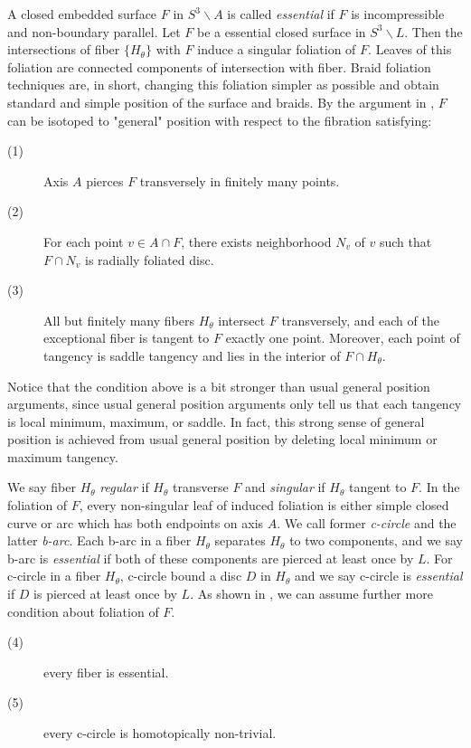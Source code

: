 \documentclass[12pt]{amsart}
\begin{document}
   A closed embedded surface $F$ in $S^{3} \backslash A$ is called {\it essential} if $F$ is incompressible and non-boundary parallel. 
Let $F$ be a essential closed surface in $S^{3} \backslash L$. Then the intersections of fiber $\{H_{\theta}\}$ with $F$ induce a singular foliation of $F$. Leaves of this foliation are connected components of intersection with fiber. Braid foliation techniques are, in short, changing this foliation simpler as possible and obtain standard and simple position of the surface and braids. 
By the argument in \cite{bf}, $F$ can be isotoped to "general" position with respect to the fibration satisfying:
\begin{description}
\item[(1)] Axis $A$ pierces $F$ transversely in finitely many points.
\item[(2)] For each point $v \in A\cap F$, there exists neighborhood $N_{v}$ of $v$ such that $F\cap N_{v}$ is radially foliated disc.
\item[(3)] All but finitely many fibers $H_{\theta}$ intersect $F$ transversely, and each of the exceptional fiber is tangent to $F$ exactly one point. Moreover, each point of tangency is saddle tangency and lies in the interior of $F \cap H_{\theta}$.
\end{description}

   Notice that the condition above is a bit stronger than usual general position arguments, since usual general position arguments only tell us that each tangency is local minimum, maximum, or saddle. In fact, this strong sense of general position is achieved from usual general position by deleting local minimum or maximum tangency.


   We say fiber $H_{\theta}$ {\it regular} if $H_{\theta}$ transverse $F$ and {\it singular}
if $H_{\theta}$ tangent to $F$. 
In the foliation of $F$, every non-singular leaf of induced foliation is either simple closed curve or arc which has both endpoints on axis $A$. We call former {\it c-circle} and the latter {\it b-arc}. Each b-arc in a fiber $H_{\theta}$ separates $H_{\theta}$ to two components, and we say b-arc is {\it essential} if both of these components are pierced at least once by $L$. For c-circle in a fiber $H_{\theta}$, c-circle bound a disc $D$ in $H_{\theta}$ and we say c-circle is {\it essential} if $D$ is pierced at least once by $L$.
As shown in \cite{bf}, we can assume further more condition about foliation of $F$.
\begin{description}
\item[(4)] every fiber is essential. 
\item[(5)] every c-circle is homotopically non-trivial.
\end{description}
\end{document}
